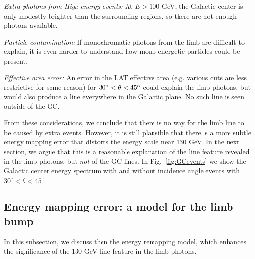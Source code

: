 \documentclass[aps,twocolumn,prd,superscriptaddress,showpacs,nofootinbib,fixfloat]{revtex4}
\newcommand{\degree}{^{\rm o}}
\begin{document}
{\it Extra photons from High energy events:} At $E > 100$
GeV, the Galactic center is only modestly brighter than the
surrounding regions, so there are not enough photons
available.

{\it Particle contamination:} If monochromatic photons from
the limb are difficult to explain, it is even harder to
understand how mono-energetic particles could be present.

{\it Effective area error:} An error in the LAT effective
area (e.g. various cuts are less restrictive for some
reason) for $30\degree < \theta < 45\degree$ could explain
the limb photons, but would also produce a line everywhere
in the Galactic plane.  No such line is seen outside of the
GC.

From these considerations, we conclude that there is no way
for the limb line to be caused by extra events. However, it
is still plausible that there is a more subtle energy
mapping error that distorts the energy scale near 130 GeV.
In the next section, we argue that this is a reasonable
explanation of the line feature revealed in the limb
photons, but {\em not} of the GC lines. In
Fig.~\ref{fig:GCevents} we show the Galactic center energy
spectrum with and without incidence angle events with
$30^\circ<\theta<45^\circ$.



\subsection{Energy mapping error: a model for the limb bump}

In this subsection, we discuss then the energy remapping
model, which enhances the significance of the 130 GeV line
feature in the limb photons.
\end{document}
